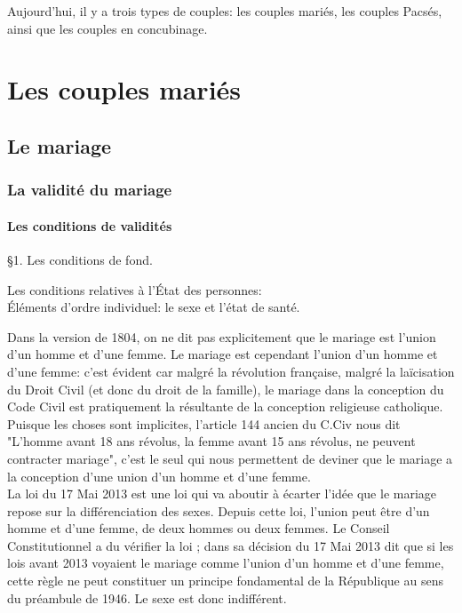 \documentclass[12pt, a4paper, openany]{book}
\begin{document}
Aujourd'hui, il y a trois types de couples: les couples mariés, les couples Pacsés, ainsi que les couples en concubinage.

\chapter{Les couples mariés}

\section{Le mariage}

\subsection{La validité du mariage}

\subsubsection{Les conditions de validités}

§1. Les conditions de fond.


Les conditions relatives à l'État des personnes: \\
Éléments d'ordre individuel: le sexe et l'état de santé.


Dans la version de 1804, on ne dit pas explicitement que le mariage est l'union d'un homme et d'une femme. Le mariage est cependant l'union d'un homme et d'une femme: c'est évident car malgré la révolution française, malgré la laïcisation du Droit Civil (et donc du droit de la famille), le mariage dans la conception du Code Civil est pratiquement la résultante de la conception religieuse catholique. Puisque les choses sont implicites, l'article 144 ancien du C.Civ nous dit "L'homme avant 18 ans révolus, la femme avant 15 ans révolus, ne peuvent contracter mariage", c'est le seul qui nous permettent de deviner que le mariage a la conception d'une union d'un homme et d'une femme. \\
La loi du 17 Mai 2013 est une loi qui va aboutir à écarter l'idée que le mariage repose sur la différenciation des sexes. Depuis cette loi, l'union peut être d'un homme et d'une femme, de deux hommes ou deux femmes. Le Conseil Constitutionnel a du vérifier la loi ; dans sa décision du 17 Mai 2013 dit que si les lois avant 2013 voyaient le mariage comme l'union d'un homme et d'une femme, cette règle ne peut constituer un principe fondamental de la République au sens du préambule de 1946. Le sexe est donc indifférent.
\end{document}
